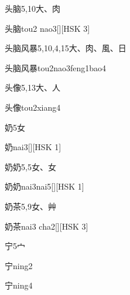 \begin{entry}{头脑}{5,10}{⼤、⾁}
  \begin{phonetics}{头脑}{tou2 nao3}[][HSK 3]
  \end{phonetics}
\end{entry}

\begin{entry}{头脑风暴}{5,10,4,15}{⼤、⾁、⾵、⽇}
  \begin{phonetics}{头脑风暴}{tou2nao3feng1bao4}
  \end{phonetics}
\end{entry}

\begin{entry}{头像}{5,13}{⼤、⼈}
  \begin{phonetics}{头像}{tou2xiang4}
  \end{phonetics}
\end{entry}

\begin{entry}{奶}{5}{⼥}
  \begin{phonetics}{奶}{nai3}[][HSK 1]
  \end{phonetics}
\end{entry}

\begin{entry}{奶奶}{5,5}{⼥、⼥}
  \begin{phonetics}{奶奶}{nai3nai5}[][HSK 1]
  \end{phonetics}
\end{entry}

\begin{entry}{奶茶}{5,9}{⼥、⾋}
  \begin{phonetics}{奶茶}{nai3 cha2}[][HSK 3]
  \end{phonetics}
\end{entry}

\begin{entry}{宁}{5}{⼧}
  \begin{phonetics}{宁}{ning2}
  \end{phonetics}
  \begin{phonetics}{宁}{ning4}
  \end{phonetics}
\end{entry}

